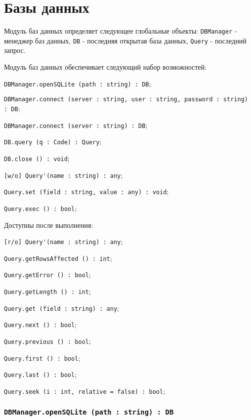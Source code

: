 \section{Базы данных}

Модуль баз данных определяет следующее глобальные объекты: \lstinline|DBManager| - менеджер баз данных, \lstinline|DB| - последняя открытая база данных, \lstinline|Query| - последний запрос.

Модуль баз данных обеспечивает следующий набор возможностей:
\begin{icItems}
    \item \lstinline|DBManager.openSQLite (path : string) : DB|;
    \item \lstinline|DBManager.connect (server : string, user : string, password : string) : DB|;
    \item \lstinline|DBManager.connect (server : string) : DB|;
	\item \lstinline|DB.query (q : Code) : Query|;
	\item \lstinline|DB.close () : void|;
	\item \lstinline|[w/o] Query'(name : string) : any|;
	\item \lstinline|Query.set (field : string, value : any) : void|;
	\item \lstinline|Query.exec () : bool|;
	\item Доступны после выполнения:
	\begin{icItems}
	    \item \lstinline|[r/o] Query'(name : string) : any|;
		\item \lstinline|Query.getRowsAffected () : int|;
		\item \lstinline|Query.getError () : bool|;
		\item \lstinline|Query.getLength () : int|;
		\item \lstinline|Query.get (field : string) : any|;
		\item \lstinline|Query.next () : bool|;
		\item \lstinline|Query.previous () : bool|;
		\item \lstinline|Query.first () : bool|;
		\item \lstinline|Query.last () : bool|;
		\item \lstinline|Query.seek (i : int, relative = false) : bool|;
	\end{icItems}
\end{icItems}

\subsubsection{\lstinline|DBManager.openSQLite (path : string) : DB|}

